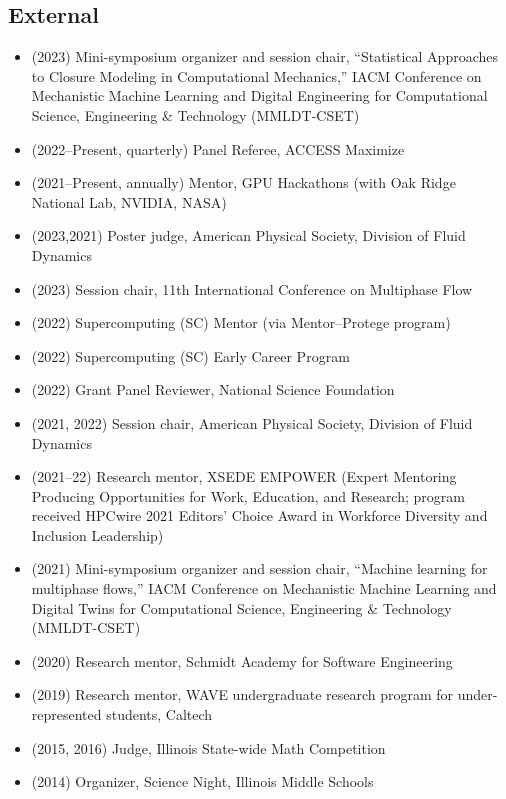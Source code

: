 \subsection{External}

\begin{itemize}
    \item (2023) Mini-symposium organizer and session chair, ``Statistical Approaches to Closure Modeling in Computational Mechanics,'' IACM Conference on Mechanistic Machine Learning and Digital Engineering for Computational Science, Engineering \& Technology (MMLDT-CSET)
    \item (2022--Present, quarterly) Panel Referee, ACCESS Maximize
    \item (2021--Present, annually) Mentor, GPU Hackathons (with Oak Ridge National Lab, NVIDIA, NASA)
    \item (2023,2021) Poster judge, American Physical Society, Division of Fluid Dynamics
    \item (2023) Session chair, 11th International Conference on Multiphase Flow
    \item (2022) Supercomputing (SC) Mentor (via Mentor--Protege program)
    \item (2022) Supercomputing (SC) Early Career Program
    \item (2022) Grant Panel Reviewer, National Science Foundation
    \item (2021, 2022) Session chair, American Physical Society, Division of Fluid Dynamics
    \item (2021--22) Research mentor, XSEDE EMPOWER (Expert Mentoring Producing Opportunities for Work, Education, and Research; program received HPCwire 2021 Editors' Choice Award in Workforce Diversity and Inclusion Leadership)
    \item (2021) Mini-symposium organizer and session chair, ``Machine learning for multiphase flows,'' IACM Conference on Mechanistic Machine Learning and Digital Twins for Computational Science, Engineering \& Technology (MMLDT-CSET)
    \item (2020) Research mentor, Schmidt Academy for Software Engineering
    \item (2019) Research mentor, WAVE undergraduate research program for under-represented students, Caltech
    \item (2015, 2016) Judge, Illinois State-wide Math Competition
    \item (2014) Organizer, Science Night, Illinois Middle Schools
\end{itemize}


